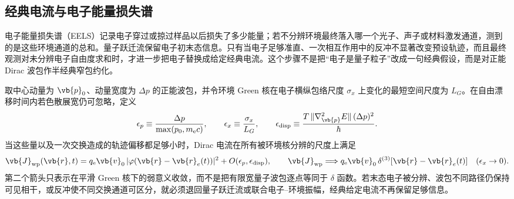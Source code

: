 \subsection{经典电流与电子能量损失谱}

电子能量损失谱（EELS）记录电子穿过或掠过样品以后损失了多少能量；若不分辨环境最终落入哪一个光子、声子或材料激发通道，测到的是这些环境通道的总和。量子跃迁流保留电子初末态信息。只有当电子足够准直、一次相互作用中的反冲不显著改变预设轨迹，而且最终观测对未分辨电子自由度求和时，才进一步把电子替换成给定经典电流。这个步骤不是把“电子是量子粒子”改成一句经典假设，而是对正能 Dirac 波包作半经典窄包约化。

取中心动量为 $\vb{p}_0$、动量宽度为 $\Delta p$ 的正能波包，并令环境 Green 核在电子横纵包络尺度 $\sigma_x$ 上变化的最短空间尺度为 $L_G$。在自由漂移时间内若色散展宽仍可忽略，定义
\begin{equation*}
\epsilon_p\equiv\frac{\Delta p}{\max(p_0,m_{\mathrm e} c)},
\qquad
\epsilon_x\equiv\frac{\sigma_x}{L_G},
\qquad
\epsilon_{\rm disp}\equiv\frac{T\,\|\nabla_{\vb{p}}^2E\|\,(\Delta p)^2}{\hbar}.
\end{equation*}
当这些量以及一次交换造成的轨迹偏移都足够小时，Dirac 电流在所有被环境核分辨的尺度上满足
\begin{equation}
{
\vb{J}_{\rm wp}(\vb{r},t)
=q_{\mathrm e}\vb{v}_0\,|\varphi(\vb{r}-\vb{r}_e(t))|^2
+O(\epsilon_p,\epsilon_{\rm disp}),
\qquad
\vb{J}_{\rm wp}\Longrightarrow q_{\mathrm e}\vb{v}_0\,\delta^{(3)}[\vb{r}-\vb{r}_e(t)]
\quad(\epsilon_x\to0).}
\label{eq:quantum_wavepacket_to_classical_current_control}
\end{equation}
第二个箭头只表示在平滑 Green 核下的弱意义收敛，而不是把有限宽量子波包逐点等同于 $\delta$ 函数。若末态电子被分辨、波包不同路径仍保持可见相干，或反冲使不同交换通道可区分，就必须退回量子跃迁流或联合电子--环境振幅，经典给定电流不再保留足够信息。

